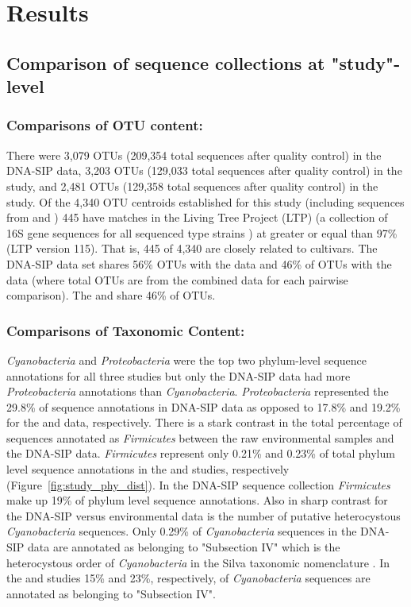 \section{Results}
\subsection{Comparison of sequence collections at "study"-level}
\subsubsection{Comparisons of OTU content:} There were 3,079 OTUs (209,354
total sequences after quality control) in the DNA-SIP data, 3,203 OTUs (129,033
total sequences after quality control) in the \citet{Garcia_Pichel_2013} study,
and 2,481 OTUs (129,358 total sequences after quality control) in the
\citet{Steven_2013} study. Of the 4,340 OTU centroids established for this
study (including sequences from \citet{Steven_2013} and
\citet{Garcia_Pichel_2013}) 445 have matches in the Living Tree Project (LTP)
(a collection of 16S gene sequences for all sequenced type strains
\citep{Yarza_2008}) at greater or equal than 97\% (LTP version 115). That is,
445 of 4,340 are closely related to cultivars. The DNA-SIP data set shares 56\%
OTUs with the \citet{Steven_2013} data and 46\% of OTUs with the
\citet{Garcia_Pichel_2013} data (where total OTUs are from the combined data
for each pairwise comparison).  The \citet{Steven_2013} and
\citet{Garcia_Pichel_2013} share 46\% of OTUs.

\subsubsection{Comparisons of Taxonomic Content:} \textit{Cyanobacteria} and
\textit{Proteobacteria} were the top two phylum-level sequence annotations
for all three studies but only the DNA-SIP data had more
\textit{Proteobacteria} annotations than \textit{Cyanobacteria}.
\textit{Proteobacteria} represented the 29.8\% of sequence annotations in
DNA-SIP data as opposed to 17.8\% and 19.2\% for the \citet{Garcia_Pichel_2013}
and \citet{Steven_2013} data, respectively.  There is a stark contrast in the
total percentage of sequences annotated as \textit{Firmicutes} between the raw
environmental samples and the DNA-SIP data. \textit{Firmicutes} represent only
0.21\% and 0.23\% of total phylum level sequence annotations in the
\citet{Steven_2013} and \citet{Garcia_Pichel_2013} studies, respectively
(Figure~\ref{fig:study_phy_dist}). In the DNA-SIP sequence collection
\textit{Firmicutes} make up 19\% of phylum level sequence annotations. Also in
sharp contrast for the DNA-SIP versus environmental data is the number of
putative heterocystous \textit{Cyanobacteria} sequences. Only 0.29\% of
\textit{Cyanobacteria} sequences in the DNA-SIP data are annotated as belonging
to "Subsection IV" which is the heterocystous order of \textit{Cyanobacteria}
in the Silva taxonomic nomenclature \citep{17947321}. In the
\citet{Steven_2013} and \citet{Garcia_Pichel_2013} studies 15\% and 23\%,
respectively, of \textit{Cyanobacteria} sequences are annotated as belonging to
"Subsection
IV".  

